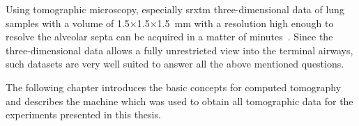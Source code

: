 Using tomographic microscopy, especially \ac{srxtm} three-dimensional data of lung samples with a volume of 1.5$\times$1.5$\times$\SI{1.5}{\milli\meter} with a resolution high enough to resolve the alveolar septa can be acquired in a matter of minutes~\cite{Hintermueller2010}. Since the three-dimensional data allows a fully unrestricted view into the terminal airways, such datasets are very well suited to answer all the above mentioned questions.

The following chapter introduces the basic concepts for computed tomography and describes the machine which was used to obtain all tomographic data for the experiments presented in this thesis.%
%
%